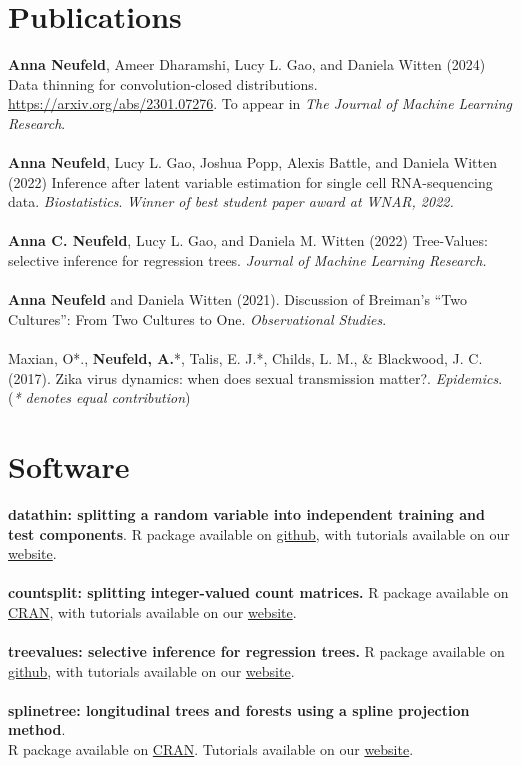 \documentclass[margin, 10pt]{res}
\begin{document}
\begin{resume}
\section{Publications} 
\textbf{Anna Neufeld}, Ameer Dharamshi, Lucy L. Gao, and Daniela Witten (2024) Data thinning for convolution-closed distributions. \href{https://arxiv.org/abs/2301.07276}{https://arxiv.org/abs/2301.07276}. To appear in \emph{The Journal of Machine Learning Research}. \\
\\
\textbf{Anna Neufeld}, Lucy L. Gao, Joshua Popp, Alexis Battle, and Daniela Witten (2022) Inference after latent variable estimation for single cell RNA-sequencing data. \emph{Biostatistics}. \emph{Winner of best student paper award at WNAR, 2022.}  \\
\\
\textbf{Anna C. Neufeld}, Lucy L. Gao, and Daniela M. Witten (2022) Tree-Values: selective inference for regression trees. \emph{Journal of Machine Learning Research.}\\
\\
\textbf{Anna Neufeld} and Daniela Witten (2021). Discussion of Breiman’s “Two Cultures”: From Two Cultures to One. \emph{Observational Studies}.  \\
\\
Maxian, O*., \textbf{Neufeld, A.}*, Talis, E. J.*, Childs, L. M., \& Blackwood, J. C. (2017). Zika virus dynamics: when does sexual transmission matter?. \emph{Epidemics}. \\
\small
(\emph{* denotes equal contribution})
\normalsize

\section{Software} 
\textbf{datathin: splitting a random variable into independent training and test components}. R package available on \href{https://github.com/anna-neufeld/datathin}{github}, with tutorials available on our \href{https://anna-neufeld.github.io/datathin/}{website}.  \\
\\
\textbf{countsplit: splitting integer-valued count matrices.} R package available on \href{https://cran.r-project.org/web/packages/countsplit/index.html}{CRAN}, with tutorials available on our \href{https://anna-neufeld.github.io/countsplit.tutorials/}{website}. \\
\\
\textbf{treevalues: selective inference for regression trees.} R package available on \href{https://github.com/anna-neufeld/treevalues}{github}, with tutorials available on our \href{https://anna-neufeld.github.io/treevalues/}{website}. \\
\\
\textbf{splinetree: longitudinal trees and forests using a spline projection method}. \\
R package available on \href{https://cran.r-project.org/web/packages/splinetree/index.html}{CRAN}. Tutorials available on our \href{https://anna-neufeld.github.io/splinetree/}{website}. 



\end{resume}
\end{document}
